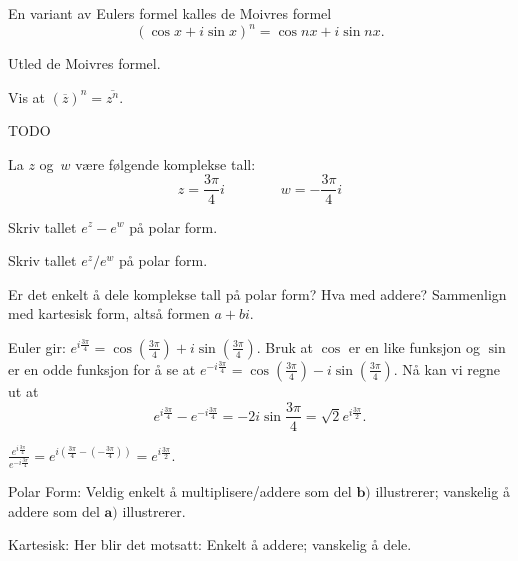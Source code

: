 \begin{oppgave}
En variant av Eulers formel kalles de Moivres formel
\[
(\cos x + i\sin x)^n=\cos nx + i\sin nx.
\]
\begin{punkt}
Utled de Moivres formel.
\end{punkt}

\begin{punkt}
Vis at $(\overline z)^n=\overline{z^n}$.
\end{punkt}
\end{oppgave}


\begin{losning}
TODO
\end{losning}


\begin{oppgave}
La $z$ og~$w$ være følgende komplekse tall:
\[
z = \frac{3\pi}{4} i
\qquad\qquad
w = -\frac{3\pi}{4}i
\]
\begin{punkt}
Skriv tallet $e^z - e^w$ på polar form.
\end{punkt}

\begin{punkt}
Skriv tallet $e^z/e^w$ på polar form.
\end{punkt}

\begin{punkt}
Er det enkelt å dele komplekse tall på polar form?
Hva med addere?
Sammenlign med kartesisk form, altså formen $a + bi$.
\end{punkt}

\end{oppgave}

\begin{losning}

\begin{punkt}
Euler gir: $e^{i\frac{3\pi}{4}}=\cos(\frac{3\pi}{4})+i\sin (\frac{3\pi}{4})$. Bruk at $\cos$ er en like funksjon og $\sin$ er en odde funksjon for å se at $e^{-i\frac{3\pi}{4}}=\cos(\frac{3\pi}{4})-i\sin (\frac{3\pi}{4})$. Nå kan vi regne ut at $$e^{i\frac{3\pi}{4}}-e^{-i\frac{3 \pi}{4}}=-2i\sin \frac{3\pi}{4}=\sqrt{2}e^{i\frac{3\pi}{2}}.$$
\end{punkt}

\begin{punkt}
$\frac{e^{i\frac{3\pi}{4}}}{e^{-i\frac{3 \pi}{4}}}=e^{i(\frac{3\pi}{4}-(-\frac{3 \pi}{4}))}=e^{i\frac{3\pi}{2}}.$ 
\end{punkt}

\begin{punkt}
Polar Form: Veldig enkelt å multiplisere/addere som del $\textbf{b)}$ illustrerer; vanskelig å addere som del $\textbf{a)}$ illustrerer.

\noindent
Kartesisk: Her blir det motsatt: Enkelt å addere; vanskelig å dele.
\end{punkt}

\end{losning}



